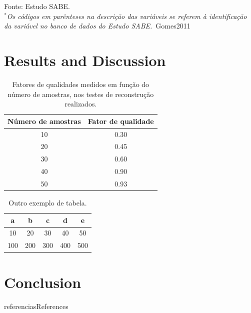 \documentclass[a4paper, 12pt]{ppgeb}
\begin{document}
\begin{frame}
\begin{center}
\begin{tabular}{|l|l|l|}
\hline
\end{tabular}
\end{center}
\vspace{-12pt}
Fonte: Estudo SABE.\\
\emph{${^{\textrm{*} }}$Os códigos em parênteses na descrição das variáveis se referem à identificação da variável no banco de dados do Estudo SABE.}~\cite{mainreferences}{Gomes2011}
\end{frame}

\chapter{Results and Discussion}\label{chap:RD}

\begin{table}[h]
\centering
\caption{Fatores de qualidades medidos em função do número de amostras, nos testes de reconstrução realizados.}\label{tab:qualidade}
\begin{tabular}{cc}
\toprule
Número de amostras & Fator de qualidade\\
\midrule
10 & 0.30\\
20 & 0.45\\
30 & 0.60\\
40 & 0.90\\
50 & 0.93\\
\bottomrule
\end{tabular}
\end{table}

\begin{table}[h]
\centering
\caption{Outro exemplo de tabela.}\label{tab:outroexemplo}
\begin{tabular}{ccccc}
    \toprule
    a     & b     & c     & d     & e \\
    \midrule
    10    & 20    & 30    & 40    & 50 \\
    100   & 200   & 300   & 400   & 500 \\
    \bottomrule
    \end{tabular}%
\end{table}

\chapter{Conclusion}\label{chap:Conclusao}

\renewcommand\bibname{\Large\scshape References}
{referencias}{References}
\end{document}
